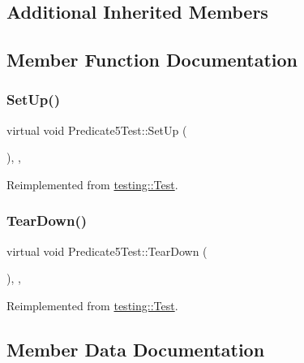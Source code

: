 \subsection*{Additional Inherited Members}


\subsection{Member Function Documentation}
\mbox{\label{classPredicate5Test_a42bf622b4f2134d0497cd42fd2e3e1df}} 
\subsubsection{\texorpdfstring{SetUp()}{SetUp()}}
{\footnotesize\ttfamily virtual void Predicate5\+Test\+::\+Set\+Up (\begin{DoxyParamCaption}{ }\end{DoxyParamCaption})\hspace{0.3cm}{\ttfamily [inline]}, {\ttfamily [protected]}, {\ttfamily [virtual]}}



Reimplemented from \mbox{\hyperlink{classtesting_1_1Test_a190315150c303ddf801313fd1a777733}{testing\+::\+Test}}.

\mbox{\label{classPredicate5Test_ab7bc4521d96174d5ef96156edc15444d}} 
\subsubsection{\texorpdfstring{TearDown()}{TearDown()}}
{\footnotesize\ttfamily virtual void Predicate5\+Test\+::\+Tear\+Down (\begin{DoxyParamCaption}{ }\end{DoxyParamCaption})\hspace{0.3cm}{\ttfamily [inline]}, {\ttfamily [protected]}, {\ttfamily [virtual]}}



Reimplemented from \mbox{\hyperlink{classtesting_1_1Test_a5f0ab439802cbe0ef7552f1a9f791923}{testing\+::\+Test}}.



\subsection{Member Data Documentation}
\mbox{\label{classPredicate5Test_aa502b7a330cc5c64785ff59aad3ef180}} 
